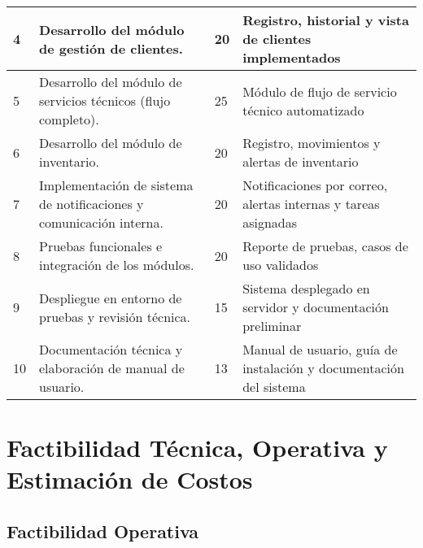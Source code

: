 \begin{longtable}{p{} p{} p{} p{}}
	4            & Desarrollo del módulo de gestión de clientes.                                & 20             & Registro, historial y vista de clientes implementados              \\
	\midrule

	5            & Desarrollo del módulo de servicios técnicos (flujo completo).                & 25             & Módulo de flujo de servicio técnico automatizado                   \\
	\midrule

	6            & Desarrollo del módulo de inventario.                                         & 20             & Registro, movimientos y alertas de inventario                      \\
	\midrule

	7            & Implementación de sistema de notificaciones y comunicación interna.          & 20             & Notificaciones por correo, alertas internas y tareas asignadas     \\
	\midrule

	8            & Pruebas funcionales e integración de los módulos.                            & 20             & Reporte de pruebas, casos de uso validados                         \\
	\midrule

	9            & Despliegue en entorno de pruebas y revisión técnica.                         & 15             & Sistema desplegado en servidor y documentación preliminar          \\
	\midrule

	10           & Documentación técnica y elaboración de manual de usuario.                    & 13             & Manual de usuario, guía de instalación y documentación del sistema \\
	\bottomrule
\end{longtable}


\section{Factibilidad Técnica, Operativa y Estimación de Costos}

\subsection{Factibilidad Operativa}

